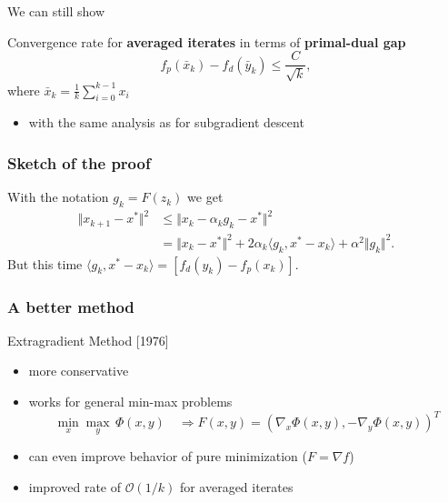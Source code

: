\documentclass[aspectratio=149]{beamer}
\begin{document}
\begin{frame}
  \frametitle{}

We can still show
  \begin{theorem}
    Convergence rate for \textbf{averaged iterates} in terms of \textbf{primal-dual gap}
    \begin{equation}
      f_p(\bar{x}_k) - f_d(\bar{y}_k) \le \frac{C}{ \sqrt{k}},
    \end{equation}
    where $\bar{x}_k = \frac{1}{k} \sum_{i=0}^{k-1} x_i $
  \end{theorem}

  \begin{itemize}
    \item with the same analysis as for subgradient descent
  \end{itemize}
\end{frame}

\begin{frame}
  \frametitle{Sketch of the proof}
  With the notation $g_k = F(z_k)$ we get
  \begin{equation}
    \begin{aligned}
      \Vert x_{k+1} - x^* \Vert^2 &\le \Vert x_k - \alpha_k g_k - x^* \Vert^2 \\
      &= \Vert x_k-x^* \Vert^2 + 2 \alpha_k \langle g_k, x^*-x_k \rangle + \alpha^2 \Vert g_k \Vert^2.
    \end{aligned}
  \end{equation}
  But this time $\langle g_k, x^* - x_k \rangle = [f_d(y_k) - f_p(x_k)]$.
\end{frame}


\begin{frame}
  \frametitle{A better method}

  \begin{algorithm}[H]
    \caption{Extragradient Method [1976]}
    \begin{algorithmic}[1]
      \EndFor{}
    \end{algorithmic}
  \end{algorithm}

  \begin{itemize}
    \item more conservative
    \item works for general min-max problems
          \begin{equation}
            \min_x \max_y \, \Phi(x,y) \quad \Rightarrow F(x,y) = {(\nabla_x \Phi(x,y), - \nabla_y \Phi(x,y))}^T
          \end{equation}
    \item can even improve behavior of pure minimization ($F = \nabla f$)
    \item improved rate of $\mathcal{O}(1/k)$ for averaged iterates
  \end{itemize}
\end{frame}
\end{document}
